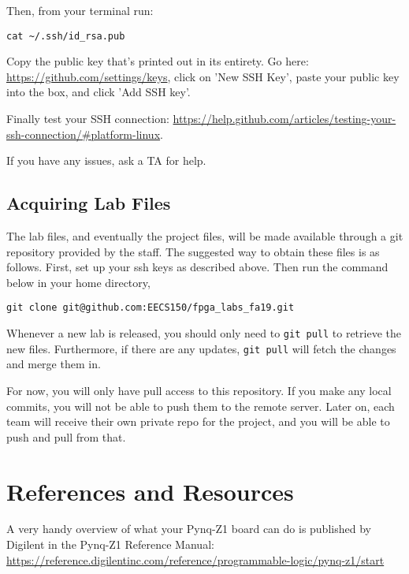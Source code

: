 \documentclass[11pt]{article}
\begin{document}
Then, from your terminal run:
\begin{verbatim}
cat ~/.ssh/id_rsa.pub
\end{verbatim}

Copy the public key that's printed out in its entirety. Go here: \url{https://github.com/settings/keys}, click on 'New SSH Key', paste your public key into the box, and click 'Add SSH key'.

Finally test your SSH connection: \url{https://help.github.com/articles/testing-your-ssh-connection/#platform-linux}.

If you have any issues, ask a TA for help.

\subsection{Acquiring Lab Files}
The lab files, and eventually the project files, will be made available through a git repository provided by the staff. The suggested way to obtain these files is as follows. First, set up your ssh keys as described above. Then run the command below in your home directory,

\begin{verbatim}
git clone git@github.com:EECS150/fpga_labs_fa19.git
\end{verbatim}

Whenever a new lab is released, you should only need to \verb|git pull| to retrieve the new files. Furthermore, if there are any updates, \verb|git pull| will fetch the changes and merge them in.

For now, you will only have pull access to this repository. If you make any local commits, you will not be able to push them to the remote server. Later on, each team will receive their own private repo for the project, and you will be able to push and pull from that.

\section{References and Resources}

A very handy overview of what your Pynq-Z1 board can do is published by Digilent in the Pynq-Z1 Reference Manual: \url{https://reference.digilentinc.com/reference/programmable-logic/pynq-z1/start}
\end{document}
